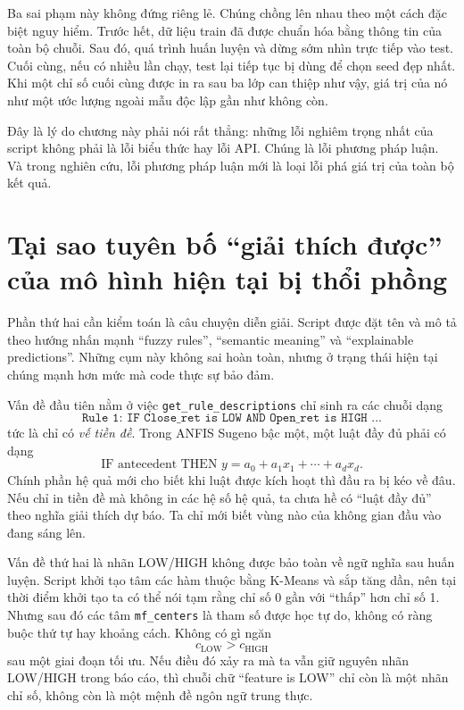 Ba sai phạm này không đứng riêng lẻ. Chúng chồng lên nhau theo một cách đặc biệt nguy hiểm. Trước hết, dữ liệu train đã được chuẩn hóa bằng thông tin của toàn bộ chuỗi. Sau đó, quá trình huấn luyện và dừng sớm nhìn trực tiếp vào test. Cuối cùng, nếu có nhiều lần chạy, test lại tiếp tục bị dùng để chọn seed đẹp nhất. Khi một chỉ số cuối cùng được in ra sau ba lớp can thiệp như vậy, giá trị của nó như một ước lượng ngoài mẫu độc lập gần như không còn.

Đây là lý do chương này phải nói rất thẳng: những lỗi nghiêm trọng nhất của script không phải là lỗi biểu thức hay lỗi API. Chúng là lỗi phương pháp luận. Và trong nghiên cứu, lỗi phương pháp luận mới là loại lỗi phá giá trị của toàn bộ kết quả.

\section{Tại sao tuyên bố ``giải thích được'' của mô hình hiện tại bị thổi phồng}

Phần thứ hai cần kiểm toán là câu chuyện diễn giải. Script được đặt tên và mô tả theo hướng nhấn mạnh ``fuzzy rules'', ``semantic meaning'' và ``explainable predictions''. Những cụm này không sai hoàn toàn, nhưng ở trạng thái hiện tại chúng mạnh hơn mức mà code thực sự bảo đảm.

Vấn đề đầu tiên nằm ở việc \texttt{get\_rule\_descriptions} chỉ sinh ra các chuỗi dạng
\[
\texttt{Rule 1: IF Close\_ret is LOW AND Open\_ret is HIGH ...}
\]
tức là chỉ có \emph{vế tiền đề}. Trong ANFIS Sugeno bậc một, một luật đầy đủ phải có dạng
\[
\text{IF antecedent THEN } y = a_0 + a_1x_1+\cdots+a_dx_d.
\]
Chính phần hệ quả mới cho biết khi luật được kích hoạt thì đầu ra bị kéo về đâu. Nếu chỉ in tiền đề mà không in các hệ số hệ quả, ta chưa hề có ``luật đầy đủ'' theo nghĩa giải thích dự báo. Ta chỉ mới biết vùng nào của không gian đầu vào đang sáng lên.

Vấn đề thứ hai là nhãn LOW/HIGH không được bảo toàn về ngữ nghĩa sau huấn luyện. Script khởi tạo tâm các hàm thuộc bằng K-Means và sắp tăng dần, nên tại thời điểm khởi tạo ta có thể nói tạm rằng chỉ số 0 gần với ``thấp'' hơn chỉ số 1. Nhưng sau đó các tâm \texttt{mf\_centers} là tham số được học tự do, không có ràng buộc thứ tự hay khoảng cách. Không có gì ngăn
\[
c_{\mathrm{LOW}} > c_{\mathrm{HIGH}}
\]
sau một giai đoạn tối ưu. Nếu điều đó xảy ra mà ta vẫn giữ nguyên nhãn LOW/HIGH trong báo cáo, thì chuỗi chữ ``feature is LOW'' chỉ còn là một nhãn chỉ số, không còn là một mệnh đề ngôn ngữ trung thực.

